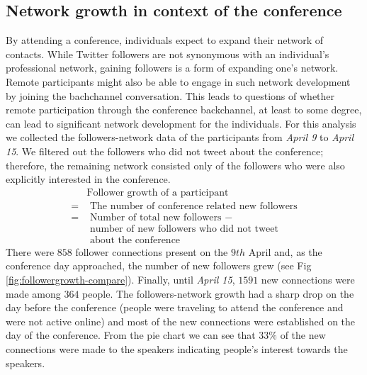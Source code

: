 \documentclass[conference,final]{IEEEtran}
\begin{document}
\subsection{Network growth in context of the conference}
By attending a conference, individuals expect to expand their network of contacts. While Twitter followers are not synonymous with an individual's professional network, gaining followers is a form of expanding one's network. Remote participants might also be able to engage in such network development by joining the bachchannel conversation. This leads to questions of whether remote participation through the conference backchannel, at least to some degree, can lead to significant network development for the individuals. For this analysis we collected the followers-network data of the participants from \textit{April 9} to \textit{April 15}. We filtered out the followers who did not tweet about the conference; therefore, the remaining network consisted only of the followers who were also explicitly interested in the conference. 
\begin{align*}
& \text{Follower growth of a participant } \\
= & \text{ The number of conference related new followers} \\
= & \text{ Number of total new followers } - \\
  & \text{ number of new followers who did not tweet}\\
  & \text{ about the conference}
\end{align*}
There were $858$ follower connections present on the $9th$ April and, as the conference day approached, the number of new followers grew (see Fig \ref{fig:followergrowth-compare}). Finally, until \textit{April 15}, $1591$ new connections were made among $364$ people. The followers-network growth had a sharp drop on the day before the conference (people were traveling to attend the conference and were not active online) and most of the new connections were established on the day of the conference. From the pie chart we can see that $33\%$ of the new connections were made to the speakers indicating people's interest towards the speakers. 
\end{document}
